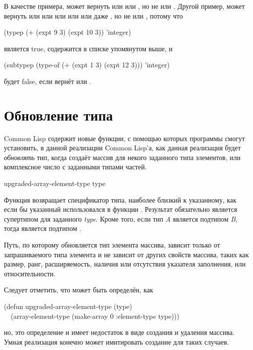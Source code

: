\begin{defun}[Функция]
В качестве примера,  может вернуть
 или  или , но не
 или .
Другой пример,  может вернуть  или 
или  или  или  или даже , но не  или , потому что
\begin{lisp}
(typep (+ (expt 9 3) (expt 10 3)) 'integer)
\end{lisp}
является true,  содержится в списке упомянутом выше, и 
\begin{lisp}
(subtypep (type-of (+ (expt 1 3) (expt 12 3))) 'integer)
\end{lisp}
будет false, если  вернёт  или .
\end{defun}

\section{Обновление типа}
Common Lisp содержит новые функции, с помощью которых программы смогут установить, в данной
реализации Common Lisp'а, как данная реализация будет \emph{обновлять} тип,
когда создаёт массив для некого заданного типа элементов, или комплексное число с
заданными типами частей.

\begin{defun}[Функция]
upgraded-array-element-type type

Функция возвращает спецификатор типа, наиболее близкий к указанному, как если бы
указанный использовался в функции .
Результат обязательно является супертипом для заданного \emph{type}.
Кроме того, если тип \emph{A} является подтипом \emph{B}, тогда 
 является подтипом
.

Путь, по которому обновляется тип элемента массива, зависит только от запрашиваемого
типа элемента и не зависит от других свойств массива, таких как размер, ранг, 
расширяемость, наличия или отсутствия указателя заполнения, или относительности.

Следует отметить, что  может быть определён,
как
\begin{lisp}
(defun upgraded-array-element-type (type) \\
~~(array-element-type (make-array 0 :element-type type)))
\end{lisp}
но, это определение и имеет недостаток в виде создания и удаления массива. Умная
реализация конечно может имитировать создание для таких случаев.
\end{defun}


